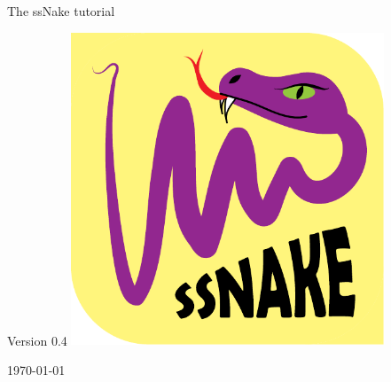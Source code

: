 \begin{titlepage}
\begin{center}




{\Huge The ssNake tutorial}

\vfill
\large Version 0.4
\vfill
\includegraphics[width=0.7\textwidth]{Images/logo.pdf}\

\vfill
\vfill
{\large \today}

\end{center}

\end{titlepage}